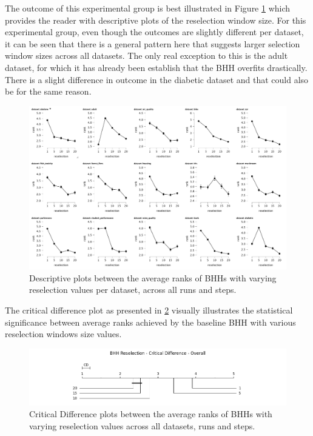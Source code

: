 The outcome of this experimental group is best illustrated in Figure \ref{fig:results:reselection:descriptive:descriptive} which provides the reader with descriptive plots of the reselection window size. For this experimental group, even though the outcomes are slightly different per dataset, it can be seen that there is a general pattern here that suggests larger selection window sizes across all datasets. The only real exception to this is the adult dataset, for which it has already been establish that the \Ac{BHH} overfits drastically. There is a slight difference in outcome in the diabetic dataset and that could also be for the same reason. 

\begin{figure}[htbp]
	\centering
	\includegraphics[width=\textwidth]{analysis/bhh_reselection/figures/descriptive/descriptive.png}
	\caption{Descriptive plots between the average ranks of \Acsp{BHH} with varying reselection values per dataset, across all runs and steps.}
	\label{fig:results:reselection:descriptive:descriptive}
\end{figure}

The critical difference plot as presented in \ref{fig:results:reselection:descriptive:cd} visually illustrates the statistical significance between average ranks achieved by the baseline \Ac{BHH} with various reselection windows size values.

\begin{figure}[htbp]
	\centering
	\includegraphics[width=\textwidth]{analysis/bhh_reselection/figures/cd/overall.png}
	\caption{Critical Difference plots between the average ranks of \Acsp{BHH} with varying reselection values across all datasets, runs and steps.}
	\label{fig:results:reselection:descriptive:cd}
\end{figure}

